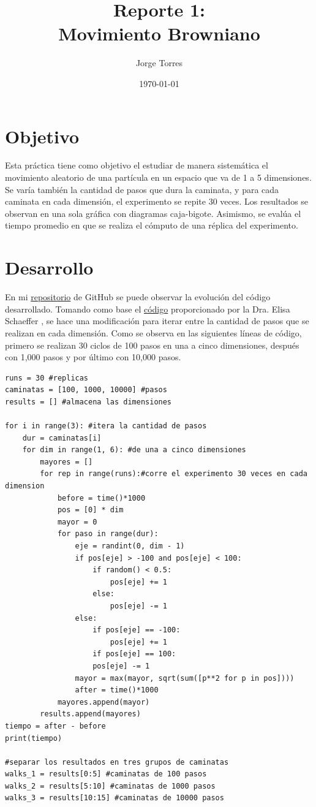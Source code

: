 \documentclass{article}
\title{Reporte 1:\\Movimiento Browniano}
\author{Jorge Torres}
\date{\today}
\begin{document}
\maketitle

\section{Objetivo}
Esta pr\'actica tiene como objetivo el estudiar de manera sistem\'atica el movimiento aleatorio de una part\'icula en un espacio que va de 1 a 5 dimensiones. Se var\'ia tambi\'en la cantidad de pasos que dura la caminata, y para cada caminata en cada dimensi\'on, el experimento se repite 30 veces. Los resultados se observan en una sola gr\'afica con diagramas caja-bigote. Asimismo, se eval\'ua el tiempo promedio en que se realiza el c\'omputo de una r\'eplica del experimento.

\section{Desarrollo}
En mi \href{https://github.com/FeroxDeitas/Simulacion-Nano/tree/main/Tareas/P1}{repositorio} de GitHub se puede observar la evoluci\'on del c\'odigo desarrollado. Tomando como base el \href{https://github.com/satuelisa/Simulation/blob/master/BrownianMotion/sinpar.py}{c\'odigo} proporcionado por la Dra. Elisa Schaeffer \cite{elisa1}, se hace una modificaci\'on para iterar entre la cantidad de pasos que se realizan en cada dimensi\'on. Como se observa en las siguientes l\'ineas de c\'odigo, primero se realizan 30 ciclos de 100 pasos en una a cinco dimensiones, despu\'es con 1,000 pasos y por \'ultimo con 10,000 pasos.

\begin{lstlisting}
runs = 30 #replicas
caminatas = [100, 1000, 10000] #pasos
results = [] #almacena las dimensiones

for i in range(3): #itera la cantidad de pasos
    dur = caminatas[i]
    for dim in range(1, 6): #de una a cinco dimensiones
        mayores = []
        for rep in range(runs):#corre el experimento 30 veces en cada dimension
            before = time()*1000
            pos = [0] * dim
            mayor = 0
            for paso in range(dur):
                eje = randint(0, dim - 1)
                if pos[eje] > -100 and pos[eje] < 100:
                    if random() < 0.5:
                        pos[eje] += 1
                    else:
                        pos[eje] -= 1
                else:
                    if pos[eje] == -100:
                        pos[eje] += 1
                    if pos[eje] == 100:
                    pos[eje] -= 1
                mayor = max(mayor, sqrt(sum([p**2 for p in pos])))
                after = time()*1000
            mayores.append(mayor)
        results.append(mayores)
tiempo = after - before
print(tiempo)

#separar los resultados en tres grupos de caminatas
walks_1 = results[0:5] #caminatas de 100 pasos
walks_2 = results[5:10] #caminatas de 1000 pasos
walks_3 = results[10:15] #caminatas de 10000 pasos
\end{lstlisting}
\end{document}
